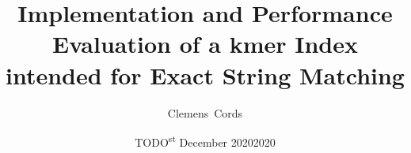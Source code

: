 \newcommand{\institute}{Institute of Computer Science}
\newcommand{\department}{Department of Computer Science and Mathematics}
\newcommand{\university}{Freie Universit\"at Berlin}
\newcommand{\researchGroup}{Databases and Information Systems}
\newcommand{\city}{Berlin}
\newcommand{\country}{Germany}

\title{Implementation and Performance Evaluation of a kmer Index intended for Exact String Matching}
\newcommand{\Year}{2020}
\date{TODO\textsuperscript{st} December \Year2020}
\newcommand{\thesisKind}{Bachelor}
\newcommand{\degree}{Bachelor~of~Science}
\newcommand{\versionnumber}{1.0}

\author{Clemens~Cords}
\newcommand{\matrikelno}{4872639}
\newcommand{\email}{clemens.cords@fu-berlin.de}

\newcommand{\supervisor}{Prof. Dr. Knut Reinert}
\newcommand{\supervisorUniversity}{Freie Universit\"at Berlin}
\newcommand{\supervisorDepartment}{Dept. of Computer Science and Mathematics}
\newcommand{\supervisorAG}{Algorithmische Bioinformatik}
\newcommand{\supervisorCountry}{Germany}

\newcommand{\fstAdvisor}{Enrico Seiler}
\newcommand{\fstAdvisorsUniversity}{Freie Universit\"at Berlin}
\newcommand{\fstAdvisorsDepartment}{Dept. of Computer Science and Mathematics}
\newcommand{\fstAdvisorsAG}{Algorithmische Bioinformatik}
\newcommand{\fstAdvisorsCountry}{Germany}

\newcommand{\sndAdvisor}{Prof. Dr. Knut Reinert}
\newcommand{\sndAdvisorsUniversity}{Freie Universit\"at Berlin} %
\newcommand{\sndAdvisorsDepartment}{Dept. of Computer Science and Mathematics}
\newcommand{\sndAdvisorsAG}{Algorithmische Bioinformatik}
\newcommand{\sndAdvisorsCountry}{Germany}

